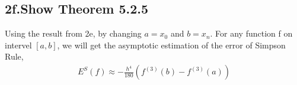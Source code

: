\documentclass{article}
\begin{document}
\subsection*{2f.Show  Theorem 5.2.5}
Using the result from 2e, by changing $a = x_0$ and $b = x_n$. For any function f on intervel $[a,b]$,
we will get the asymptotic estimation of the error of Simpson Rule,
\begin{equation}
  \begin{split}
    E^{S}(f)\approx  - \frac{h^4}{180}  (f^{(3)}(b)- f^{(3)}(a))\\
  \end{split}
\end{equation}
\end{document}
